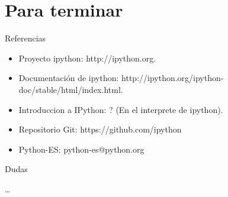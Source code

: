 \documentclass[10pt]{beamer}
\begin{document}
  \section*{Para terminar}
  
  \begin{frame}{Referencias}
    \begin{itemize}
      \item Proyecto ipython: http://ipython.org.
      \item Documentación de ipython: http://ipython.org/ipython-doc/stable/html/index.html.
      \item Introduccion a IPython: ? (En el interprete de ipython).
      \item Repositorio Git: https://github.com/ipython
      \item Python-ES: python-es@python.org
    \end{itemize}
  \end{frame}

  \begin{frame}{Dudas}
    \begin{center}
      \dots
    \end{center}
  \end{frame}
\end{document}
